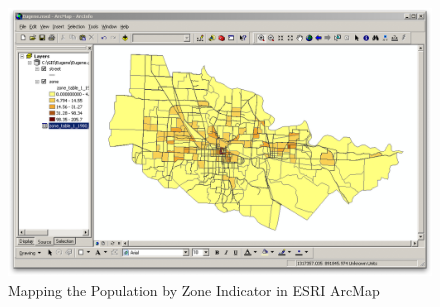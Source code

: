 \begin{figure}[htp]
\begin{center}
\includegraphics[scale=0.4]{graphics/indicator-population-zone-arcgis.png}
\end{center}
\caption{Mapping the Population by Zone Indicator in ESRI ArcMap}
\label{fig:indicator-population-zone-arcgis}
\end{figure}


